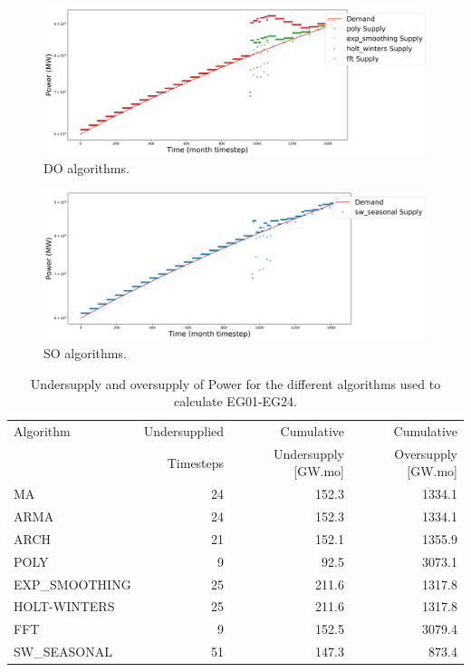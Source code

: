 \documentclass[11pt]{article}
\begin{document}
\begin{figure}[!h]
	\centering
	\includegraphics[width=\textwidth]{30-figures/lin-30-power-buffer02.png} 
	\hfill
	\caption{DO algorithms.}
	\label{fig:30-lin-DO}
\end{figure}

\begin{figure}[!h]
	\centering
	\includegraphics[width=\textwidth]{30-figures/lin-30-power-buffer03.png} 
	\hfill
	\caption{SO algorithms.}
	\label{fig:30-lin-SO}
\end{figure}

\begin{table}[!h]
	\centering
	\caption{Undersupply and oversupply of Power for the different algorithms used to calculate EG01-EG24.}
	\label{tab:30-lin-power}
	\begin{tabularx}{\textwidth}{lRRR}
		\hline
		Algorithm & Undersupplied & Cumulative  & Cumulative \\
		& Timesteps     & Undersupply [GW.mo]  & Oversupply [GW.mo] \\ \hline
		MA        & 24 & 152.3 & 1334.1 \\ 
		ARMA      & 24 & 152.3 & 1334.1 \\ 
		ARCH      & 21 & 152.1 & 1355.9 \\ 
		POLY      &  9 & 92.5 & 3073.1 \\ 
		EXP\_SMOOTHING 	& 25 & 211.6 & 1317.8 \\ 
		HOLT-WINTERS  	& 25 & 211.6 & 1317.8 \\ 
		FFT       & 9 & 152.5 & 3079.4 \\ 
		SW\_SEASONAL  & 51 & 147.3 & 873.4 \\ \hline
	\end{tabularx}
\end{table}
\end{document}
